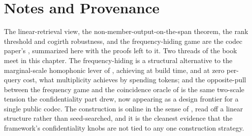 \section{Notes and Provenance}
\label{sec:ch12-notes}

The linear-retrieval view, the non-member-output-on-the-span theorem, the
rank threshold and cogirth robustness, and the frequency-hiding game are the
codec paper's \cite{towell2026codec}, summarized here with the proofs left to
it. Two threads of the book meet in this chapter. The frequency-hiding is a
structural alternative to the marginal-scale homophonic lever of
, achieving at build time, and at zero per-query
cost, what multiplicity achieves by spending tokens; and the opposite-pull
between the frequency game and the coincidence oracle of
 is the same two-scale tension the
confidentiality part drew, now appearing as a design frontier for a single
public codec. The construction is online in the sense of
, read off a linear structure rather than seed-searched,
and it is the cleanest evidence that the framework's confidentiality knobs
are not tied to any one construction strategy.
